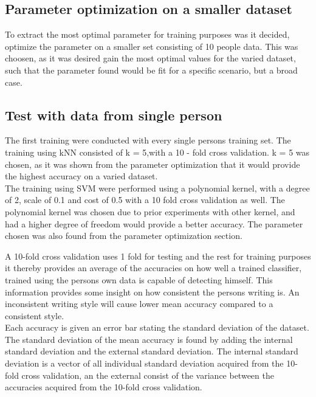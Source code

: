 \subsection{Parameter optimization on a smaller dataset}
To extract the most optimal parameter for training purposes was it decided, optimize the parameter on a smaller set consisting of 10 people data.  This was choosen, as it was desired gain the most optimal values for the varied dataset, such that the parameter found would be fit for a specific scenario, but a broad case. 

\subsection{Test with data from single person}
\label{sec::test_with_data_from_single_person}

The first training were conducted with every single persons training set. The 
training using kNN consisted of k = 5,with a 10 - fold cross validation. k = 5 
was chosen, as it was shown from the parameter optimization that it would provide the highest accuracy on a varied dataset. \\

The training using SVM were performed using a polynomial kernel, with a degree 
of 2, scale of 0.1   and cost of 0.5 with a 10 fold cross validation as well. 
The polynomial kernel was chosen due to prior experiments with other kernel, and 
had a higher degree of freedom would provide a better accuracy. The parameter chosen was also found from the parameter optimization section. 

 
A
10-fold cross validation uses 1 fold for testing and the rest for training 
purposes it thereby provides an average of the accuracies on how well a trained 
classifier, trained using the persons own data is capable of detecting himself.  
This information provides some insight on how consistent the persons writing is. 
An inconsistent writing style will cause lower mean accuracy compared to a 
consistent style. \\

Each accuracy is given an error bar stating the standard deviation of the 
dataset. The standard deviation of the mean accuracy is found by adding the 
internal standard deviation and the external standard deviation. The internal 
standard deviation is a vector of all individual standard deviation acquired 
from the 10-fold cross validation, an the external consist of the variance 
between the accuracies acquired  from the 10-fold cross validation. \\
 
